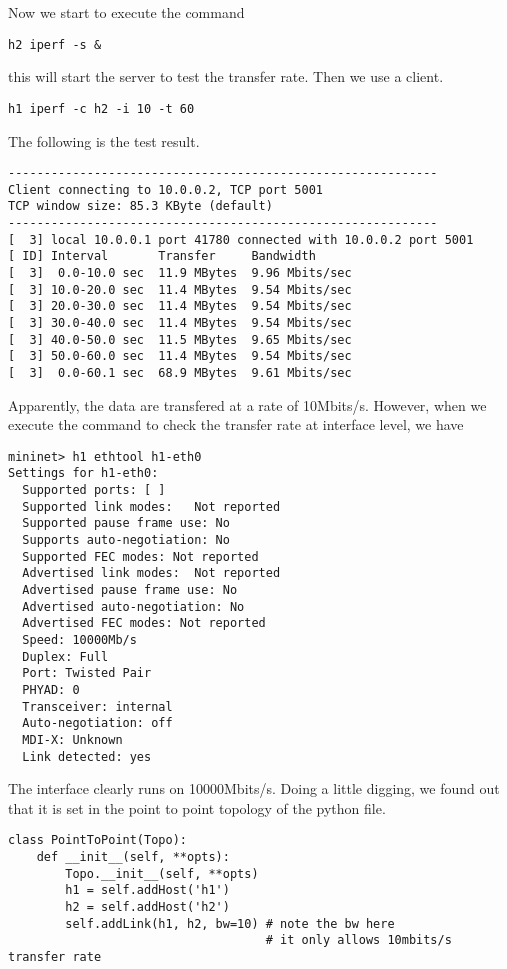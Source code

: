 \documentclass[11pt]{article}
\begin{document}
Now we start to execute the command
\begin{verbatim}
h2 iperf -s &
\end{verbatim}
this will start the server to test the transfer rate.
Then we use a client.
\begin{verbatim}
h1 iperf -c h2 -i 10 -t 60
\end{verbatim}
The following is the test result.
\begin{verbatim}
------------------------------------------------------------
Client connecting to 10.0.0.2, TCP port 5001
TCP window size: 85.3 KByte (default)
------------------------------------------------------------
[  3] local 10.0.0.1 port 41780 connected with 10.0.0.2 port 5001
[ ID] Interval       Transfer     Bandwidth
[  3]  0.0-10.0 sec  11.9 MBytes  9.96 Mbits/sec
[  3] 10.0-20.0 sec  11.4 MBytes  9.54 Mbits/sec
[  3] 20.0-30.0 sec  11.4 MBytes  9.54 Mbits/sec
[  3] 30.0-40.0 sec  11.4 MBytes  9.54 Mbits/sec
[  3] 40.0-50.0 sec  11.5 MBytes  9.65 Mbits/sec
[  3] 50.0-60.0 sec  11.4 MBytes  9.54 Mbits/sec
[  3]  0.0-60.1 sec  68.9 MBytes  9.61 Mbits/sec
\end{verbatim}
Apparently, the data are transfered at a rate of 10Mbits/s. However, when we
execute the command to check the transfer rate at interface level, we have
\begin{verbatim}
mininet> h1 ethtool h1-eth0
Settings for h1-eth0:
  Supported ports: [ ]
  Supported link modes:   Not reported
  Supported pause frame use: No
  Supports auto-negotiation: No
  Supported FEC modes: Not reported
  Advertised link modes:  Not reported
  Advertised pause frame use: No
  Advertised auto-negotiation: No
  Advertised FEC modes: Not reported
  Speed: 10000Mb/s
  Duplex: Full
  Port: Twisted Pair
  PHYAD: 0
  Transceiver: internal
  Auto-negotiation: off
  MDI-X: Unknown
  Link detected: yes
\end{verbatim}
The interface clearly runs on 10000Mbits/s.
Doing a little digging, we found out that it is set in the point to point
topology of the python file.
\begin{verbatim}
class PointToPoint(Topo):
    def __init__(self, **opts):
        Topo.__init__(self, **opts)
        h1 = self.addHost('h1')
        h2 = self.addHost('h2')
        self.addLink(h1, h2, bw=10) # note the bw here
                                    # it only allows 10mbits/s transfer rate
\end{verbatim}
\end{document}
